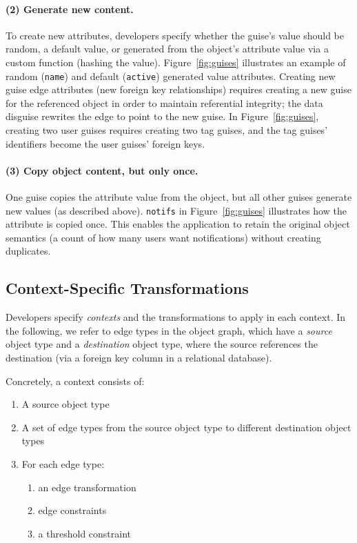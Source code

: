 \paragraph{(2) Generate new content.}
To create new attributes, developers specify whether the guise's value should be random,
a default value, or generated from the object's attribute value via a custom function (\eg hashing 
the value).
%
Figure~\ref{fig:guises} illustrates an example of random (\texttt{name}) and default
(\texttt{active}) generated value attributes.
%
%
Creating new guise edge attributes (\eg new foreign key relationships) requires
creating a new guise for the referenced object in order to maintain referential
integrity;
the data disguise rewrites the edge to point to the new guise.
%
In Figure~\ref{fig:guises}, creating two user guises requires creating two
tag guises, and the tag guises' identifiers become the user guises' foreign keys.
%

\paragraph{(3) Copy object content, but only once.}
%
One guise copies the attribute value from the object, but all other guises generate new
values (as described above).
%
\texttt{notifs} in Figure~\ref{fig:guises} illustrates how the attribute is copied once.
%
This enables the application to retain the original object semantics (\eg a count of how many
users want notifications) without creating duplicates.
%

\subsection{Context-Specific Transformations}
\label{sec:context}

Developers specify \emph{contexts} and the transformations to apply in each context.
%
%
In the following, we refer to edge types in the object graph, which have a \emph{source} object type and a \emph{destination} object type,
where the source references the destination (\eg via a foreign key column in a relational database).

Concretely, a context consists of:
\begin{enumerate}[nosep]
    \item A source object type
    \item A set of edge types from the source object type to different destination object types
    \item For each edge type: 
        \begin{enumerate}[nosep]
            \item an edge transformation 
            \item edge constraints
            \item a threshold constraint
        \end{enumerate}
\end{enumerate}


